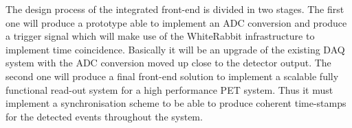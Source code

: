 The design process of the integrated front-end is divided in two stages. The first one will produce a prototype able to implement an ADC conversion and produce a trigger signal which will make use of the WhiteRabbit infrastructure to implement time coincidence. Basically it will be an upgrade of the existing DAQ system with the ADC conversion moved up close to the detector output. The second one will produce a final front-end solution to implement a scalable fully functional read-out system for a high performance PET system. Thus it must implement a synchronisation scheme to be able to produce coherent time-stamps for the detected events throughout the system.  
% 
% 

